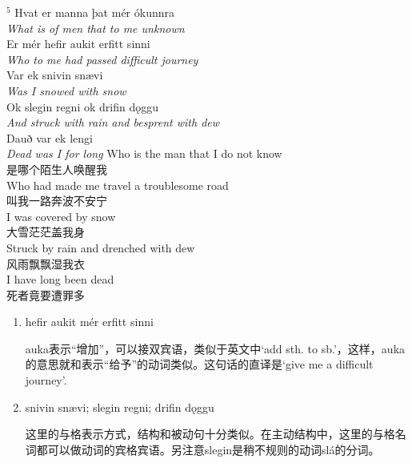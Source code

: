 \begin{paracol}{2}
  \noindent
  $^5$ Hvat er manna þat mér ókunnra\\
  \textit{What is of men that to me unknown}\\
  Er mér hefir aukit erfitt sinni\\
  \textit{Who to me had passed difficult journey}\\
  Var ek snivin snævi \\
  \textit{Was I snowed with snow}\\
  Ok slegin regni ok drifin dǫggu \\
  \textit{And struck with rain and besprent with dew}\\
  Dauð var ek lengi\\
  \textit{Dead was I for long}
  \switchcolumn
  \noindent
  Who is the man that I do not know\\
  是哪个陌生人唤醒我\\
  Who had made me travel a troublesome road\\
  叫我一路奔波不安宁\\
  I was covered by snow\\
  大雪茫茫盖我身\\
  Struck by rain and drenched with dew\\
  风雨飘飘湿我衣\\
  I have long been dead\\
  死者竟要遭罪多\\
\end{paracol}
\begin{grammar*}{}
  \begin{enumerate}[leftmargin=*]
    \item hefir aukit mér erfitt sinni

          auka表示“增加”，可以接双宾语，类似于英文中`add sth. to sb.'，这样，auka的意思就和表示“给予”的动词类似。这句话的直译是`give me a difficult journey'.

    \item snivin snævi; slegin regni; drifin dǫggu

          这里的与格表示方式，结构和被动句十分类似。在主动结构中，这里的与格名词都可以做动词的宾格宾语。另注意slegin是稍不规则的动词slá的分词。
  \end{enumerate}
\end{grammar*}

